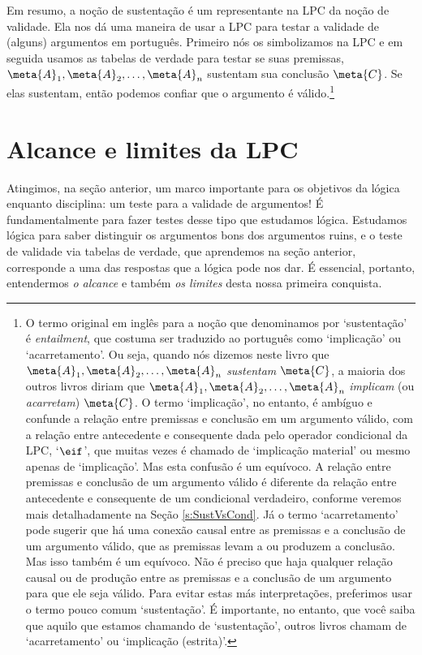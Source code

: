 Em resumo, a noção de sustentação é um representante na LPC da noção de validade.
Ela nos dá uma maneira de usar a LPC para testar a validade de (alguns) argumentos em português.
Primeiro nós os simbolizamos na LPC e em seguida usamos as tabelas de verdade para testar se suas premissas, $\meta{A}_1, \meta{A}_2, \ldots, \meta{A}_n$ sustentam sua conclusão $\meta{C}$.
Se elas sustentam, então podemos confiar que o argumento é válido.\footnote{
	O termo original em inglês para a noção que denominamos por `sustentação' é \emph{entailment}, que costuma ser traduzido ao português como `implicação' ou `acarretamento'.
	Ou seja, quando nós dizemos neste livro que $\meta{A}_1, \meta{A}_2, \ldots, \meta{A}_n$ \emph{sustentam} $\meta{C}$, a maioria dos outros livros diriam que $\meta{A}_1, \meta{A}_2, \ldots, \meta{A}_n$ \emph{implicam} (ou \emph{acarretam}) $\meta{C}$.
	O termo `implicação', no entanto, é ambíguo e confunde a relação entre premissas e conclusão em um argumento válido, com a relação entre antecedente e consequente dada pelo operador condicional da LPC, `$\eif$', que muitas vezes é chamado de `implicação material' ou mesmo apenas de `implicação'.
	Mas esta confusão é um equívoco.
	A relação entre premissas e conclusão de um argumento válido é diferente da relação entre antecedente e consequente de um condicional verdadeiro, conforme veremos mais detalhadamente na Seção \ref{s:SustVsCond}.
	Já o termo `acarretamento' pode sugerir que há uma conexão causal entre as premissas e a conclusão de um argumento válido, que as premissas levam a ou produzem a conclusão.
	Mas isso também é um equívoco.
	Não é preciso que haja qualquer relação causal ou de produção entre as premissas e a conclusão de um argumento para que ele seja válido.
	Para evitar estas más interpretações, preferimos usar o termo pouco comum `sustentação'.
	É importante, no entanto, que você saiba que aquilo que estamos chamando de `sustentação', outros livros chamam de `acarretamento' ou `implicação (estrita)'.}


\section{Alcance e limites da LPC}\label{s:ParadoxesOfMaterialConditional}
Atingimos, na seção anterior, um marco importante para os objetivos da lógica enquanto disciplina: um teste para a validade de argumentos!
É fundamentalmente para fazer testes desse tipo que estudamos lógica.
Estudamos lógica para saber distinguir os argumentos bons dos argumentos ruins, e o teste de validade via tabelas de verdade, que aprendemos na seção anterior, corresponde a uma das respostas que a lógica pode nos dar.
É essencial, portanto, entendermos \emph{o alcance} e também \emph{os limites} desta nossa primeira conquista.

